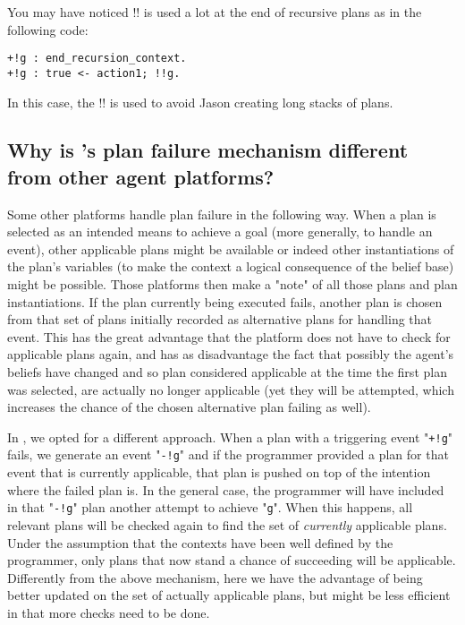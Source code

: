 \documentclass{article}
\newcommand{\jason}[0]{\htlink{\textit{Jason}}{http://jason.sf.net}\xspace}
\begin{document}
\begin{description}
You may have noticed !! is used a lot at the end of recursive
plans as in the following code:
\begin{verbatim}
+!g : end_recursion_context.
+!g : true <- action1; !!g.
\end{verbatim}
In this case, the !! is used to avoid Jason creating long stacks of
plans. 


\subsection{Why is \jason's plan failure mechanism different from
  other agent platforms?}

Some other platforms handle plan failure in the following way. When a
plan is selected as an intended means to achieve a goal (more
generally, to handle an event), other applicable plans might be
available or indeed other instantiations of the plan's variables (to
make the context a logical consequence of the belief base) might be
possible. Those platforms then make a "note" of all those plans and
plan instantiations. If the plan currently being executed fails,
another plan is chosen from that set of plans initially recorded as
alternative plans for handling that event. This has the great
advantage that the platform does not have to check for applicable
plans again, and has as disadvantage the fact that possibly the
agent's beliefs have changed and so plan considered applicable at the
time the first plan was selected, are actually no longer applicable
(yet they will be attempted, which increases the chance of the chosen
alternative plan failing as well).

In \jason, we opted for a different approach. When a plan with a
triggering event "\texttt{+!g}" fails, we generate an event
"\texttt{-!g}" and if the programmer provided a plan for that event
that is currently applicable, that plan is pushed on top of the
intention where the failed plan is. In the general case, the
programmer will have included in that "\texttt{-!g}" plan another
attempt to achieve "\texttt{g}". When this happens, all relevant plans
will be checked again to find the set of \emph{currently} applicable
plans. Under the assumption that the contexts have been well defined
by the programmer, only plans that now stand a chance of succeeding
will be applicable. Differently from the above mechanism, here we have
the advantage of being better updated on the set of actually
applicable plans, but might be less efficient in that more checks need
to be done.


\end{description}
\end{document}
